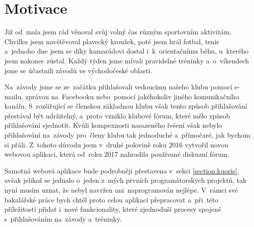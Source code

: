 \section{Motivace}
Již od~mala jsem rád věnoval svůj volný čas různým sportovním aktivitám. Chvilku jsem navštěvoval plavecký kroužek, poté jsem hrál fotbal, tenis a~jednoho dne jsem se díky kamarádovi dostal i~k~orientačnímu běhu, u~kterého jsem nakonec zůstal. Každý týden jsme mívali pravidelné tréninky a~o~víkendech jsme se účastnili závodů ve východočeské oblasti.

Na~závody jsme se ze~začátku přihlašovali vedoucímu našeho klubu pomocí e-mailu, zprávou na~Facebooku nebo~pomocí jakéhokoliv jiného komunikačního kanálu. S~rozšiřující se členskou základnou klubu však tento způsob přihlašování přestával být udržitelný, a~proto vzniklo klubové fórum, které mělo způsob přihlašování sjednotit. Kvůli kompexnosti nasazeného řešení však nebylo přihlašování na~závody pro~členy klubu tak jednoduché a~přímočaré, jak bychom si přáli. Z~tohoto důvodu jsem v~druhé polovině roku 2016 vytvořil novou webovou aplikaci, která od~roku 2017 nahradila používané diskuzní fórum.

Samotná webová aplikace bude podrobněji přestavena v~sekci \ref{section:kuoris}, avšak jelikož se jednalo o~jeden z~mých prvních programátorských projektů, tak nyní musím uznat, že nebyl navržen ani~naprogramován nejlépe. V~rámci své bakalářské práce bych chtěl proto celou aplikaci přepracovat a~při~této příležitosti přidat i~nové funkcionality, které zjednoduší procesy spojené s~přihlašováním na~závody a~tréninky.
